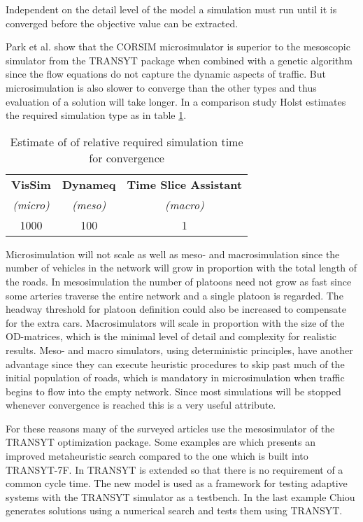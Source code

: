 Independent on the detail level of the model a simulation must run until it is converged before the objective value can be extracted. 

Park et al. \cite{4} show that the CORSIM microsimulator is superior to the mesoscopic simulator from the TRANSYT package when combined with a genetic algorithm since the flow equations do not capture the dynamic aspects of traffic. But microsimulation is also slower to converge than the other types and thus evaluation of a solution will take longer. In a comparison study \cite{simcompare} Holst estimates the required simulation type as in table \ref{tab:convergespeed}.

\begin{table}[!ht]
\begin{center}
\begin{tabular}{c|c|c}
\textbf{VisSim} & \textbf{Dynameq} & \textbf{Time Slice Assistant} \\
\textit{(micro)} & \textit{(meso)} & \textit{(macro)} \\ \hline
1000 & 100 & 1
\end{tabular}
\end{center}
\caption{Estimate of of relative required simulation time for convergence}
\label{tab:convergespeed}
\end{table}

Microsimulation will not scale as well as meso- and macrosimulation since the number of vehicles in the network will grow in proportion with the total length of the roads. In mesosimulation the number of platoons need not grow as fast since some arteries traverse the entire network and a single platoon is regarded. The headway threshold for platoon definition could also be increased to compensate for the extra cars. Macrosimulators will scale in proportion with the size of the OD-matrices, which is the minimal level of detail and complexity for realistic results. 
Meso- and macro simulators, using deterministic principles, have another advantage since they can execute heuristic procedures to skip past much of the initial population of roads, which is mandatory in microsimulation when traffic begins to flow into the empty network. Since most simulations will be stopped whenever convergence is reached this is a very useful attribute.

For these reasons many of the surveyed articles use the mesosimulator of the TRANSYT optimization package. Some examples are \cite{26} which presents an improved metaheuristic search compared to the one which is built into TRANSYT-7F. In \cite{43} TRANSYT is extended so that there is no requirement of a common cycle time. The new model is used as a framework for testing adaptive systems with the TRANSYT simulator as a testbench.
In the last example Chiou \cite{34} generates solutions using a numerical search and tests them using TRANSYT.

